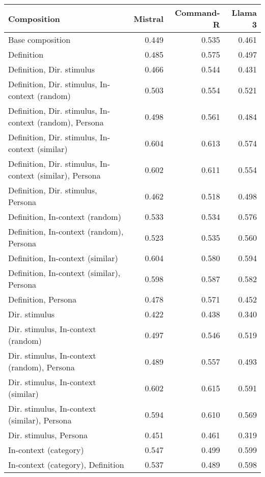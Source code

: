 \begin{table*}
    \small
    \centering
    \begin{tabular}{lrrr}
        \toprule
        \textbf{Composition} & \textbf{Mistral} & \textbf{Command-R} & \textbf{Llama 3} \\
        \midrule
        Base composition & 0.449 & 0.535 & 0.461 \\
        Definition & 0.485 & 0.575 & 0.497 \\
        Definition, Dir. stimulus & 0.466 & 0.544 & 0.431 \\
        Definition, Dir. stimulus, In-context (random) & 0.503 & 0.554 & 0.521 \\
        Definition, Dir. stimulus, In-context (random), Persona & 0.498 & 0.561 & 0.484 \\
        Definition, Dir. stimulus, In-context (similar) & 0.604 & 0.613 & 0.574 \\
        Definition, Dir. stimulus, In-context (similar), Persona & 0.602 & 0.611 & 0.554 \\
        Definition, Dir. stimulus, Persona & 0.462 & 0.518 & 0.498 \\
        Definition, In-context (random) & 0.533 & 0.534 & 0.576 \\
        Definition, In-context (random), Persona & 0.523 & 0.535 & 0.560 \\
        Definition, In-context (similar) & 0.604 & 0.580 & 0.594 \\
        Definition, In-context (similar), Persona & 0.598 & 0.587 & 0.582 \\
        Definition, Persona & 0.478 & 0.571 & 0.452 \\
        Dir. stimulus & 0.422 & 0.438 & 0.340 \\
        Dir. stimulus, In-context (random) & 0.497 & 0.546 & 0.519 \\
        Dir. stimulus, In-context (random), Persona & 0.489 & 0.557 & 0.493 \\
        Dir. stimulus, In-context (similar) & 0.602 & 0.615 & 0.591 \\
        Dir. stimulus, In-context (similar), Persona & 0.594 & 0.610 & 0.569 \\
        Dir. stimulus, Persona & 0.451 & 0.461 & 0.319 \\
        In-context (category) & 0.547 & 0.499 & 0.599 \\
        In-context (category), Definition & 0.537 & 0.489 & 0.598 \\

\end{tabular}
\end{table*}
